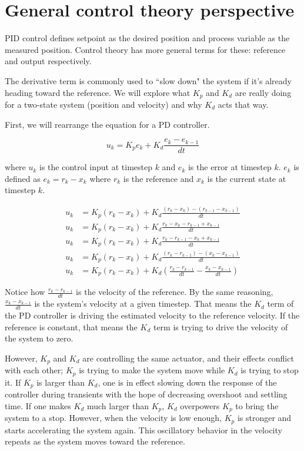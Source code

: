 \section{General control theory perspective}

PID control defines \gls{setpoint} as the desired position and
\gls{process variable} as the measured position. Control theory has more general
terms for these: \gls{reference} and \gls{output} respectively.

The derivative term is commonly used to ``slow down" the \gls{system} if it's
already heading toward the \gls{reference}. We will explore what $K_p$ and $K_d$
are really doing for a two-state \gls{system} (position and velocity) and why
$K_d$ acts that way.

First, we will rearrange the equation for a PD controller.

\begin{equation*}
  u_k = K_p e_k + K_d \frac{e_k - e_{k-1}}{dt}
\end{equation*}

where $u_k$ is the \gls{control input} at timestep $k$ and $e_k$ is the
\gls{error} at timestep $k$. $e_k$ is defined as $e_k = r_k - x_k$ where $r_k$
is the \gls{reference} and $x_k$ is the current \gls{state} at timestep $k$.

\begin{align*}
  u_k &= K_p (r_k - x_k) + K_d \frac{(r_k - x_k) - (r_{k-1} - x_{k-1})}{dt} \\
  u_k &= K_p (r_k - x_k) + K_d \frac{r_k - x_k - r_{k-1} + x_{k-1}}{dt} \\
  u_k &= K_p (r_k - x_k) + K_d \frac{r_k - r_{k-1} - x_k + x_{k-1}}{dt} \\
  u_k &= K_p (r_k - x_k) + K_d \frac{(r_k - r_{k-1}) - (x_k - x_{k-1})}{dt} \\
  u_k &= K_p (r_k - x_k) + K_d \left(\frac{r_k - r_{k-1}}{dt} -
    \frac{x_k - x_{k-1}}{dt}\right)
\end{align*}

Notice how $\frac{r_k - r_{k-1}}{dt}$ is the velocity of the \gls{reference}. By
the same reasoning, $\frac{x_k - x_{k-1}}{dt}$ is the \gls{system}'s velocity at
a given timestep. That means the $K_d$ term of the PD controller is driving the
estimated velocity to the \gls{reference} velocity. If the \gls{reference} is
constant, that means the $K_d$ term is trying to drive the velocity of the
\gls{system} to zero.

However, $K_p$ and $K_d$ are controlling the same actuator, and their effects
conflict with each other; $K_p$ is trying to make the \gls{system} move while
$K_d$ is trying to stop it. If $K_p$ is larger than $K_d$, one is in effect
slowing down the response of the controller during transients with the hope of
decreasing \gls{overshoot} and \gls{settling time}. If one makes $K_d$ much
larger than $K_p$, $K_d$ overpowers $K_p$ to bring the \gls{system} to a stop.
However, when the velocity is low enough, $K_p$ is stronger and starts
accelerating the \gls{system} again. This oscillatory behavior in the velocity
repeats as the \gls{system} moves toward the \gls{reference}.
